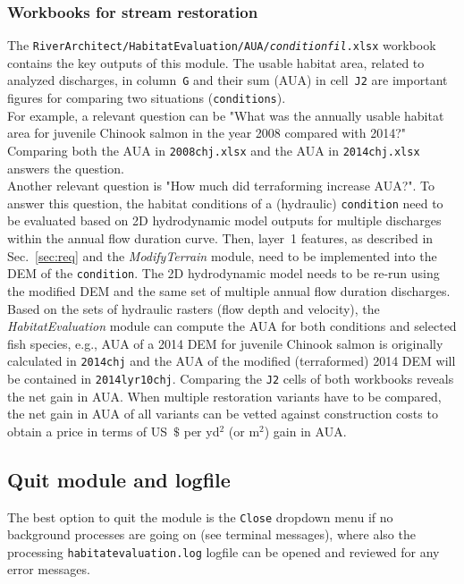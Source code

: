 \subsubsection{Workbooks for stream restoration} \label{sec:heoutwork}
The \texttt{RiverArchitect/HabitatEvaluation/AUA/\textit{condition}{\myUnderscore}\textit{fil}.xlsx} workbook contains the key outputs of this module. The usable habitat area, related to analyzed discharges, in column~\texttt{G} and their sum (AUA) in cell~\texttt{J2} are important figures for comparing two situations (\texttt{conditions}).\\
For example, a relevant question can be "What was the annually usable habitat area for juvenile Chinook salmon in the year 2008 compared with 2014?" Comparing both the AUA in \texttt{2008{\myUnderscore}chj.xlsx} and the AUA in \texttt{2014{\myUnderscore}chj.xlsx} answers the question.\\
Another relevant question is "How much did terraforming increase AUA?". To answer this question, the habitat conditions of a (hydraulic) \texttt{condition} need to be evaluated based on 2D hydrodynamic model outputs for multiple discharges within the annual flow duration curve. Then, layer~1 features, as described in Sec.~\ref{sec:req} and the \textit{ModifyTerrain} module, need to be implemented into the DEM of the \texttt{condition}. The 2D hydrodynamic model needs to be re-run using the modified DEM and the same set of multiple annual flow duration discharges. Based on the sets of hydraulic rasters (flow depth and velocity), the \textit{HabitatEvaluation} module can compute the AUA for both conditions and selected fish species, e.g., AUA of a 2014 DEM for juvenile Chinook salmon is originally calculated in \texttt{2014{\myUnderscore}chj} and the AUA of the modified (terraformed) 2014 DEM will be contained in \texttt{2014{\myUnderscore}lyr10{\myUnderscore}chj}. Comparing the \texttt{J2} cells of both workbooks reveals the net gain in AUA. When multiple restoration variants have to be compared, the net gain in AUA of all variants can be vetted against construction costs to obtain a price in terms of US~$\$$ per yd$^2$ (or m$^2$) gain in AUA.

\subsection{Quit module and logfile}
The best option to quit the module is the \texttt{Close} dropdown menu if no background processes are going on (see terminal messages), where also the processing \texttt{habitat{\myUnderscore}evaluation.log} logfile can be opened and reviewed for any error messages. 

